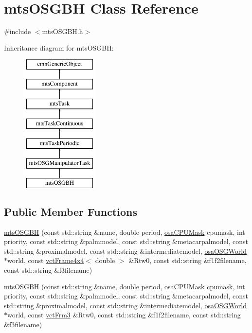 \hypertarget{classmts_o_s_g_b_h}{\section{mts\-O\-S\-G\-B\-H Class Reference}
\label{classmts_o_s_g_b_h}
}


{\ttfamily \#include $<$mts\-O\-S\-G\-B\-H.\-h$>$}

Inheritance diagram for mts\-O\-S\-G\-B\-H\-:\begin{figure}[H]
\begin{center}
\leavevmode
\includegraphics[height=7.000000cm]{d4/d8a/classmts_o_s_g_b_h}
\end{center}
\end{figure}
\subsection*{Public Member Functions}
\begin{DoxyCompactItemize}
\item 
\hyperlink{classmts_o_s_g_b_h_addf83e60d69c2adbf3ddbedd12a1fcf9}{mts\-O\-S\-G\-B\-H} (const std\-::string \&name, double period, \hyperlink{osa_c_p_u_affinity_8h_aaec7cdd7797e5e6eb5438c15fee5477a}{osa\-C\-P\-U\-Mask} cpumask, int priority, const std\-::string \&palmmodel, const std\-::string \&metacarpalmodel, const std\-::string \&proximalmodel, const std\-::string \&intermediatemodel, \hyperlink{classosa_o_s_g_world}{osa\-O\-S\-G\-World} $\ast$world, const \hyperlink{classvct_frame4x4}{vct\-Frame4x4}$<$ double $>$ \&Rtw0, const std\-::string \&f1f2filename, const std\-::string \&f3filename)
\item 
\hyperlink{classmts_o_s_g_b_h_a617315a3039576e70ee46481d94a37a1}{mts\-O\-S\-G\-B\-H} (const std\-::string \&name, double period, \hyperlink{osa_c_p_u_affinity_8h_aaec7cdd7797e5e6eb5438c15fee5477a}{osa\-C\-P\-U\-Mask} cpumask, int priority, const std\-::string \&palmmodel, const std\-::string \&metacarpalmodel, const std\-::string \&proximalmodel, const std\-::string \&intermediatemodel, \hyperlink{classosa_o_s_g_world}{osa\-O\-S\-G\-World} $\ast$world, const \hyperlink{vct_transformation_types_8h_a81feda0a02c2d1bc26e5553f409fed20}{vct\-Frm3} \&Rtw0, const std\-::string \&f1f2filename, const std\-::string \&f3filename)
\end{DoxyCompactItemize}
